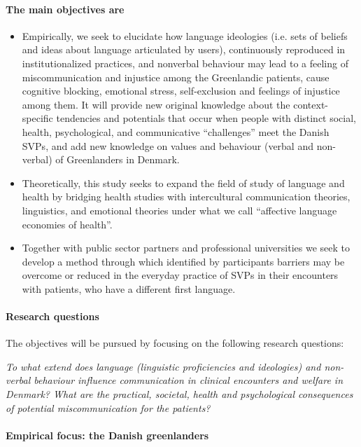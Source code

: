 \documentclass[twocolumn, serif, rga, authordate]{jote-article}
\begin{document}
\paragraph{The main objectives are}

\begin{itemize}
\item Empirically, we seek to elucidate how language ideologies (i.e. sets of beliefs and ideas about language articulated by users), continuously reproduced in institutionalized practices, and nonverbal behaviour may lead to a feeling of miscommunication and injustice among the Greenlandic patients, cause cognitive blocking, emotional stress, self-exclusion and feelings of injustice among them. It will provide new original knowledge about the context-specific tendencies and potentials that occur when people with distinct social, health, psychological, and communicative ``challenges'' meet the Danish SVPs, and add new knowledge on values and behaviour (verbal and non-verbal) of Greenlanders in Denmark.

\item Theoretically, this study seeks to expand the field of study of language and health by bridging health studies with intercultural communication theories, linguistics, and emotional theories under what we call ``affective language economies of health''.

\item Together with public sector partners and professional universities we seek to develop a method through which identified by participants barriers may be overcome or reduced in the everyday practice of SVPs in their encounters with patients, who have a different first language.

        \end{itemize}

\paragraph{Research questions}

The objectives will be pursued by focusing on the following research questions:

\emph{To what extend does language (linguistic proficiencies and ideologies) and non-verbal behaviour influence communication in clinical encounters and welfare in Denmark? What are the practical, societal, health and psychological consequences of potential miscommunication for the patients?}


\paragraph{Empirical focus: the Danish greenlanders}
\end{document}
